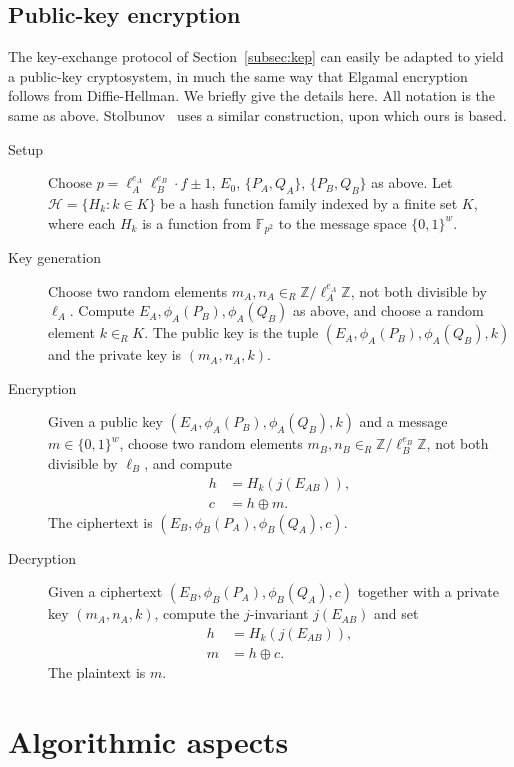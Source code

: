 \documentclass[jmc]{degruyter-journal-a}
\theoremstyle{definition}
\newcommand{\ZZ}{{\mathbb{Z}}}
\newcommand{\FF}{{\mathbb{F}}}
\begin{document}
\subsection{Public-key encryption}\label{subsec:pk}

The key-exchange protocol of Section~\ref{subsec:kep} can easily be
adapted to yield a public-key cryptosystem, in much the same way that
Elgamal encryption follows from Diffie-Hellman. We briefly give the
details here. All notation is the same as above. Stolbunov~\cite{Stol}
uses a similar construction, upon which ours is based.

\begin{description}
\item[Setup] Choose $p = \ell_A^{e_A} \ell_B^{e_B} \cdot f \pm 1$,
  $E_0$, $\{P_A,Q_A\}$, $\{P_B,Q_B\}$ as above. Let $\mathcal{H} =
  \{H_k: k \in K\}$ be a hash function family indexed by a finite set
  $K$, where each $H_k$ is a function from $\FF_{p^2}$ to the message
  space $\{0,1\}^w$.
\item[Key generation] Choose two random elements $m_A,n_A \in_R
\ZZ/\ell_A^{e_A}\ZZ$, not both divisible by $\ell_A$. Compute $E_A,
\phi_A(P_B), \phi_A(Q_B)$ as above, and choose a random element $k
\in_R K$. The public key is the tuple $(E_A, \phi_A(P_B), \phi_A(Q_B), k)$ and
the private key is $(m_A,n_A,k)$.
\item[Encryption] Given a public key $(E_A, \phi_A(P_B), \phi_A(Q_B),
  k)$ and a message $m \in \{0,1\}^w$, choose two random elements
  $m_B,n_B \in_R \ZZ/\ell_B^{e_B}\ZZ$, not both divisible by $\ell_B$,
  and compute
\begin{align*}
h &= H_k(j(E_{AB})), \\
c &= h \oplus m.
\end{align*}
The ciphertext is $(E_B, \phi_B(P_A), \phi_B(Q_A), c)$.
\item[Decryption] Given a ciphertext $(E_B, \phi_B(P_A), \phi_B(Q_A),
  c)$ together with a private key $(m_A,n_A,k)$, compute the $j$-invariant
  $j(E_{AB})$ and set
\begin{align*}
h &= H_k(j(E_{AB})), \\
m &= h \oplus c.
\end{align*}
The plaintext is $m$.
\end{description}

\section{Algorithmic aspects}\label{sec:alg}
\end{document}
